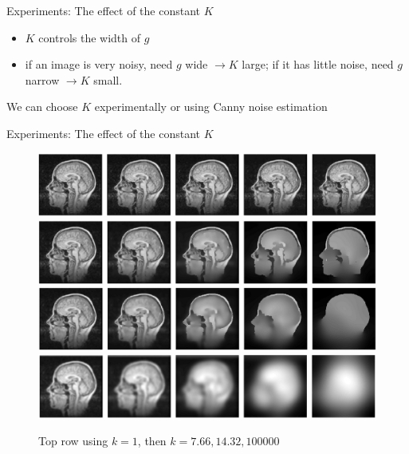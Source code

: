 \documentclass{beamer}
\begin{document}
\begin{frame}{Experiments: The effect of the constant $K$}

        \begin{itemize}
            \item $K$ controls the width of $g$
            \item if an image is very noisy, need $g$ wide $\to K$ large; if it has little noise, need $g$ narrow $\to K$ small.
        \end{itemize}
    We can choose $K$ experimentally or using Canny noise estimation

\end{frame}

\begin{frame}{Experiments: The effect of the constant $K$}

    \begin{figure}[h!]
            \centering            \includegraphics[scale=0.21]{effectofk1.png}
            \includegraphics[scale=0.21]{effectofk2.png}
            \includegraphics[scale=0.21]{effectofk3.png}
            \includegraphics[scale=0.21]{effectofk4.png}
            \caption{Top row using $k=1$, then $k=7.66,14.32,100000$}
    \end{figure}

\end{frame}
\end{document}
